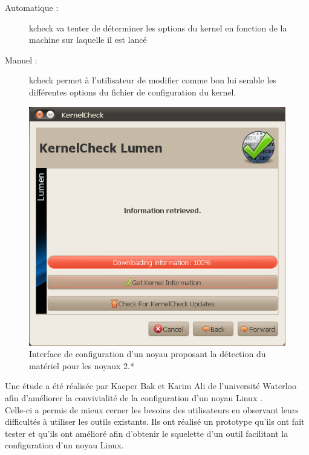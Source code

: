 \documentclass[16pts]{report}
\begin{document}
\begin{description}
    \begin{description}
        \item[Automatique :] kcheck va tenter de déterminer les options du kernel
            en fonction de la machine sur laquelle il est lancé
        \item[Manuel :] kcheck permet à l’utilisateur de modifier comme bon lui
            semble les différentes options du fichier de configuration du kernel.
    \end{description}
        \begin{figure}[H]
            \includegraphics[scale=0.8]{illustrations/kernel_check.png}
            \centering
            \caption{Interface de configuration d'un noyau proposant la détection du matériel pour les noyaux 2.*}
            \label{fig:KernelCheck}
        \end{figure}
\end{description}

Une étude a été réalisée par Kacper Bak et Karim Ali de l’université Waterloo
afin d’améliorer la convivialité de la configuration d’un noyau Linux
\cite{Waterloo:Etude}.  \\

Celle-ci a permis de mieux cerner les besoins des utilisateurs en observant
leurs difficultés à utiliser les outils existants. Ils ont réalisé un prototype
qu’ils ont fait tester et qu’ils ont amélioré afin d’obtenir le squelette d’un
outil facilitant la configuration d’un noyau Linux. \\ \\
\end{document}

